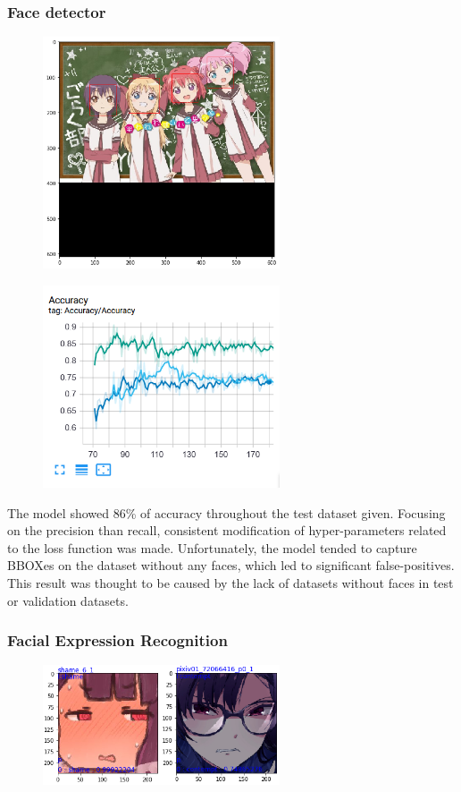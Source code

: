 \documentclass{article}
\begin{document}
\subsubsection{Face detector}
\begin{figure}[h]
  \centering
  \includegraphics[width=7cm]{image/yolo_example.png}
\end{figure}
\begin{figure}[h]
  \centering
  \includegraphics[width=7cm]{image/yolo_accuracy.png}
\end{figure}

The model showed 86\% of accuracy throughout the test dataset given. Focusing on
the precision than recall, consistent modification of hyper-parameters related
to the loss function was made. Unfortunately, the model tended to capture BBOXes
on the dataset without any faces, which led to significant false-positives. This
result was thought to be caused by the lack of datasets without faces in test or
validation datasets.

\subsubsection{Facial Expression Recognition}
\begin{figure}[h]
  \centering
  \includegraphics[width=7cm]{image/classifier_example.png}
\end{figure}
\end{document}
